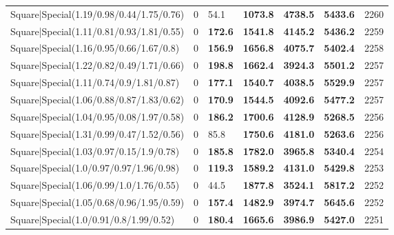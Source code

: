 \begin{tabular}{lrllllr}
 Square|Special(1.19/0.98/0.44/1.75/0.76)                      &             0   & 54.1           & \textbf{1073.8} & \textbf{4738.5} & \textbf{5433.6} &         2260 \\
 Square|Special(1.11/0.81/0.93/1.81/0.55)                      &             0   & \textbf{172.6} & \textbf{1541.8} & \textbf{4145.2} & \textbf{5436.2} &         2259 \\
 Square|Special(1.16/0.95/0.66/1.67/0.8)                       &             0   & \textbf{156.9} & \textbf{1656.8} & \textbf{4075.7} & \textbf{5402.4} &         2258 \\
 Square|Special(1.22/0.82/0.49/1.71/0.66)                      &             0   & \textbf{198.8} & \textbf{1662.4} & \textbf{3924.3} & \textbf{5501.2} &         2257 \\
 Square|Special(1.11/0.74/0.9/1.81/0.87)                       &             0   & \textbf{177.1} & \textbf{1540.7} & \textbf{4038.5} & \textbf{5529.9} &         2257 \\
 Square|Special(1.06/0.88/0.87/1.83/0.62)                      &             0   & \textbf{170.9} & \textbf{1544.5} & \textbf{4092.6} & \textbf{5477.2} &         2257 \\
 Square|Special(1.04/0.95/0.08/1.97/0.58)                      &             0   & \textbf{186.2} & \textbf{1700.6} & \textbf{4128.9} & \textbf{5268.5} &         2256 \\
 Square|Special(1.31/0.99/0.47/1.52/0.56)                      &             0   & 85.8           & \textbf{1750.6} & \textbf{4181.0} & \textbf{5263.6} &         2256 \\
 Square|Special(1.03/0.97/0.15/1.9/0.78)                       &             0   & \textbf{185.8} & \textbf{1782.0} & \textbf{3965.8} & \textbf{5340.4} &         2254 \\
 Square|Special(1.0/0.97/0.97/1.96/0.98)                       &             0   & \textbf{119.3} & \textbf{1589.2} & \textbf{4131.0} & \textbf{5429.8} &         2253 \\
 Square|Special(1.06/0.99/1.0/1.76/0.55)                       &             0   & 44.5           & \textbf{1877.8} & \textbf{3524.1} & \textbf{5817.2} &         2252 \\
 Square|Special(1.05/0.68/0.96/1.95/0.59)                      &             0   & \textbf{157.4} & \textbf{1482.9} & \textbf{3974.7} & \textbf{5645.6} &         2252 \\
 Square|Special(1.0/0.91/0.8/1.99/0.52)                        &             0   & \textbf{180.4} & \textbf{1665.6} & \textbf{3986.9} & \textbf{5427.0} &         2251 \\

\end{tabular}
